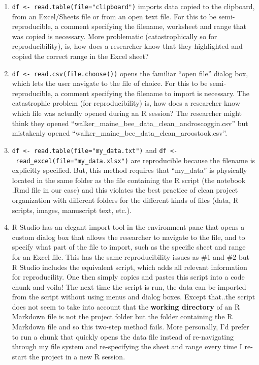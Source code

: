 \documentclass[]{book}
\providecommand{\tightlist}{%
  \setlength{\itemsep}{0pt}\setlength{\parskip}{0pt}}
\begin{document}
\begin{enumerate}
\def\labelenumi{\arabic{enumi}.}
\tightlist
\item
  \texttt{df\ \textless{}-\ read.table(file="clipboard")} imports data
  copied to the clipboard, from an Excel/Sheets file or from an open
  text file. For this to be semi-reproducible, a comment specifying the
  filename, worksheet and range that was copied is necessary. More
  problematic (catastrophically so for reproducibility), is, how does a
  researcher know that they highlighted and copied the correct range in
  the Excel sheet?
\item
  \texttt{df\ \textless{}-\ read.csv(file.choose())} opens the familiar
  ``open file'' dialog box, which lets the user navigate to the file of
  choice. For this to be semi-reproducible, a comment specifying the
  filename to import is necessary. The catastrophic problem (for
  reproducibility) is, how does a researcher know which file was
  actually opened during an R session? The researcher might think they
  opened ``walker\_maine\_bee\_data\_clean\_androscoggin.csv'' but
  mistakenly opened ``walker\_maine\_bee\_data\_clean\_aroostook.csv''.
\item
  \texttt{df\ \textless{}-\ read.table(file="my\_data.txt")} and
  \texttt{df\ \textless{}-\ read\_excel(file="my\_data.xlsx")} are
  reproducible because the filename is explicitly specified. But, this
  method requires that ``my\_data'' is physically located in the same
  folder as the file containing the R script (the notebook .Rmd file in
  our case) and this violates the best practice of clean project
  organization with different folders for the different kinds of files
  (data, R scripts, images, manuscript text, etc.).
\item
  R Studio has an elegant import tool in the environment pane that opens
  a custom dialog box that allows the researcher to navigate to the
  file, and to specify what part of the file to import, such as the
  specific sheet and range for an Excel file. This has the same
  reproducibility issues as \#1 and \#2 but R Studio includes the
  equivalent script, which adds all relevant information for
  reproducility. One then simply copies and pastes this script into a
  code chunk and voila! The next time the script is run, the data can be
  imported from the script without using menus and dialog boxes. Except
  that..the script does not seem to take into account that the
  \textbf{working directory} of an R Markdown file is not the project
  folder but the folder containing the R Markdown file and so this
  two-step method fails. More personally, I'd prefer to run a chunk that
  quickly opens the data file instead of re-navigating through my file
  system and re-specifying the sheet and range every time I re-start the
  project in a new R session.
\end{enumerate}
\end{document}
